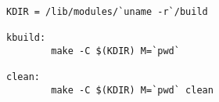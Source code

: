 \begin{verbatim}
KDIR = /lib/modules/`uname -r`/build

kbuild:
        make -C $(KDIR) M=`pwd`

clean:
        make -C $(KDIR) M=`pwd` clean

\end{verbatim}
